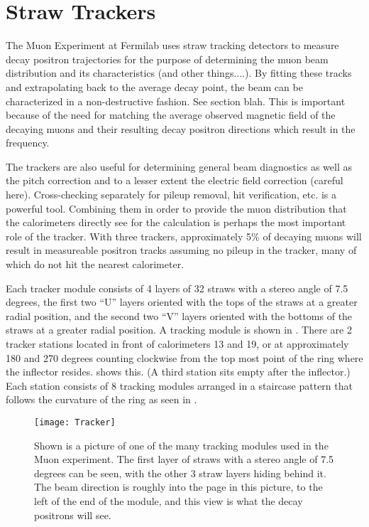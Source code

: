 \section{Straw Trackers}
\label{sec:StrawTrackers}

The Muon \gmtwo Experiment at Fermilab uses straw tracking detectors to measure decay positron trajectories for the purpose of determining the muon beam distribution and its characteristics (and other things....). By fitting these tracks and extrapolating back to the average decay point, the beam can be characterized in a non-destructive fashion. See section blah. This is important because of the need for matching the average observed magnetic field of the decaying muons and their resulting decay positron directions which result in the \wa frequency.

The trackers are also useful for determining general beam diagnostics as well as the pitch correction and to a lesser extent the electric field correction (careful here). Cross-checking separately for pileup removal, hit verification, etc. is a powerful tool. Combining them in order to provide the muon distribution that the calorimeters directly see for the \wa calculation is perhaps the most important role of the tracker. With three trackers, approximately 5\% of decaying muons will result in measureable positron tracks assuming no pileup in the tracker, many of which do not hit the nearest calorimeter.

Each tracker module consists of 4 layers of 32 straws with a stereo angle of 7.5 degrees, the first two ``U'' layers oriented with the tops of the straws at a greater radial position, and the second two ``V'' layers oriented with the bottoms of the straws at a greater radial position. A tracking module is shown in . There are 2 tracker stations located in front of calorimeters 13 and 19, or at approximately 180 and 270 degrees counting clockwise from the top most point of the ring where the inflector resides.  shows this. (A third station sits empty after the inflector.) Each station consists of 8 tracking modules arranged in a staircase pattern that follows the curvature of the ring as seen in .

\begin{figure}[]
    \centering
    \texttt{[image: Tracker]}
    \caption[Tracker module]{Shown is a picture of one of the many tracking modules used in the Muon \gmtwo experiment. The first layer of straws with a stereo angle of 7.5 degrees can be seen, with the other 3 straw layers hiding behind it. The beam direction is roughly into the page in this picture, to the left of the end of the module, and this view is what the decay positrons will see.}
    \label{fig:tracker}
\end{figure}

